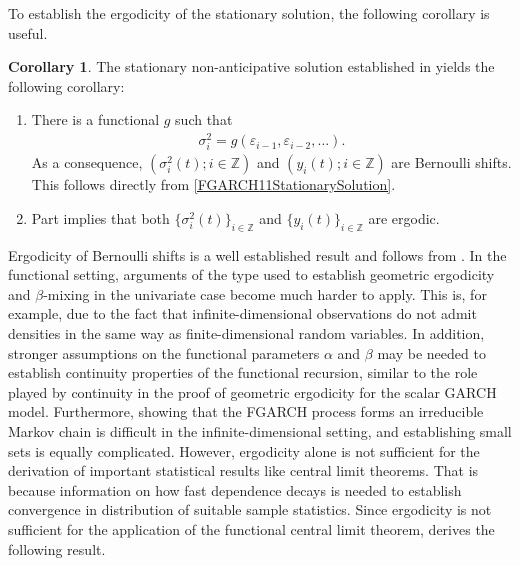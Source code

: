 \documentclass[12pt,a4paper]{article}
\theoremstyle{definition}
\newtheorem{corollary}{Corollary}[section]
\begin{document}
To establish the ergodicity of the stationary solution, the following corollary is useful.
\begin{corollary}
The stationary non-anticipative solution established in  yields the following corollary:
    \begin{enumerate}[label=(\roman*)]
        \item
        \label{FirstPointCorollary}
        There is a functional $g$ such that
        \begin{gather}
            \sigma_i^2=g(\varepsilon_{i-1},\varepsilon_{i-2},...).
        \end{gather}
        As a consequence, $(\sigma_i^2(t);i\in\mathbb{Z})$ and $(y_i(t);i\in \mathbb{Z})$ are Bernoulli shifts. This follows directly from \cref{FGARCH11StationarySolution}.
        \item
        \label{SecondPointCorollary}
        Part  implies that both $\{\sigma_i^2(t)\}_{i\in\mathbb{Z}}$ and $\{y_i(t)\}_{i\in\mathbb{Z}}$ are ergodic.
    \end{enumerate}
\end{corollary}
Ergodicity of Bernoulli shifts is a well established result and follows from \citet{stout1974almost}. In the functional setting, arguments of the type used to establish geometric ergodicity and $\beta$-mixing in the univariate case become much harder to apply. This is, for example, due to the fact that infinite-dimensional observations do not admit densities in the same way as finite-dimensional random variables. In addition, stronger assumptions on the functional parameters $\alpha$ and $\beta$ may be needed to establish continuity properties of the functional recursion, similar to the role played by continuity in the proof of geometric ergodicity for the scalar GARCH model. Furthermore, showing that the FGARCH process forms an irreducible Markov chain is difficult in the infinite-dimensional setting, and establishing small sets is equally complicated. However, ergodicity alone is not sufficient for the derivation of important statistical results like central limit theorems. That is because information on how fast dependence decays is needed to establish convergence in distribution of suitable sample statistics. Since ergodicity is not sufficient for the application of the functional central limit theorem, \citet{Aue2017} derives the following result.
\end{document}
